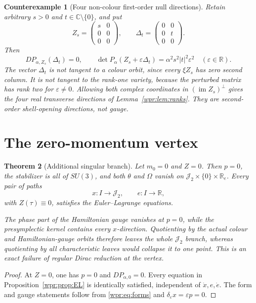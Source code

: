 \documentclass[11pt]{article}
\newtheorem{theorem}{Theorem}[section]
\newtheorem{counterexample}[theorem]{Counterexample}
\newcommand{\J}{\mathcal J_2}
\begin{document}
\begin{counterexample}[Four non-colour first-order null directions]
\label{wpr:ce:transverse}
Retain arbitrary \(s>0\) and \(t\in\mathbb C\setminus\{0\}\), and put
\[
 Z_s=\begin{pmatrix}s&0\\0&0\\0&0\end{pmatrix},\qquad
 \Delta_t=\begin{pmatrix}0&0\\0&t\\0&0\end{pmatrix}.
\]
Then
\begin{equation}
 D P_{\alpha,Z_s}(\Delta_t)=0,\qquad
 \det P_\alpha(Z_s+\varepsilon\Delta_t)
 =\alpha^2s^2|t|^2\varepsilon^2
 \quad(\varepsilon\in\mathbb R).
 \label{wpr:eq:transverse}
\end{equation}
The vector \(\Delta_t\) is not tangent to a colour orbit, since every
\(\xi Z_s\) has zero second column.  It is not tangent to the rank-one
variety, because the perturbed matrix has rank two for
\(\varepsilon\neq0\).  Allowing both complex coordinates in
\((\operatorname{im}Z_s)^\perp\) gives the four real transverse
directions of Lemma~\ref{wpr:lem:ranks}.  They are second-order
shell-opening directions, not gauge.
\end{counterexample}

\section{The zero-momentum vertex}
\begin{theorem}[Additional singular branch]
\label{wpr:thm:zero}
Let \(m_0=0\) and \(Z=0\).  Then \(p=0\), the stabilizer is all of
\(SU(3)\), and both \(\theta\) and \(\Omega\) vanish on
\(\J\times\{0\}\times\mathbb R_e\).  Every pair of paths
\[
 x:I\to\J,\qquad e:I\to\mathbb R,
\]
with \(Z(\tau)\equiv0\), satisfies the Euler--Lagrange equations.

The phase part of the Hamiltonian gauge vanishes at \(p=0\), while the
presymplectic kernel contains every \(x\)-direction.  Quotienting by
the actual colour and Hamiltonian-gauge orbits therefore leaves the
whole \(\J\) branch, whereas quotienting by all characteristic leaves
would collapse it to one point.  This is an exact failure of regular
Dirac reduction at the vertex.
\end{theorem}
\begin{proof}
At \(Z=0\), one has \(p=0\) and \(D P_{\alpha,0}=0\).  Every equation
in Proposition~\ref{wpr:prop:EL} is identically satisfied, independent
of \(\dot x,e,\dot e\).  The form and gauge statements follow from
\eqref{wpr:eq:forms} and
\(\delta_\varepsilon x=\varepsilon p=0\).
\end{proof}
\end{document}
